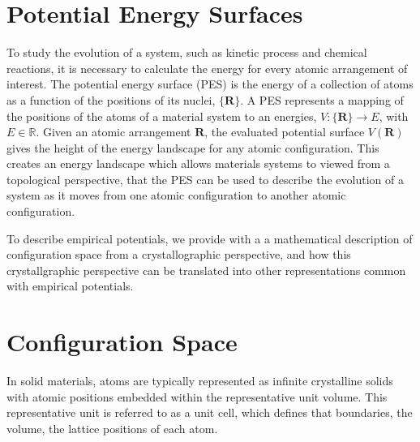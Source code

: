 \section{Potential Energy Surfaces}

To study the evolution of a system, such as kinetic process and chemical reactions, it is necessary to calculate the energy for every atomic arrangement of interest.  The potential energy surface (PES) is the energy of a collection of atoms as a function of the positions of its nuclei, $\{\bm{R}\}$.
A PES represents a mapping of the positions of the atoms of a material system to an energies, $V:\{\bm{R}\}\rightarrow E$, with $E\in\mathbb{R}$.
Given an atomic arrangement $\bm{R}$, the evaluated potential surface $V(\bm{R})$ gives the height of the energy landscape for any atomic configuration.
This creates an energy landscape which allows materials systems to viewed from a topological perspective, that the PES can be used to describe the evolution of a system as it moves from one atomic configuration to another atomic configuration.

To describe empirical potentials, we provide with a a mathematical description of configuration space from a crystallographic perspective, and how this crystallgraphic perspective can be translated into other representations common with empirical potentials.

\section{Configuration Space}
\label{sec:configuration_space}
In solid materials, atoms are typically represented as infinite crystalline solids with atomic positions embedded within the representative unit volume.
This representative unit is referred to as a unit cell, which defines that boundaries, the volume, the lattice positions of each atom.

